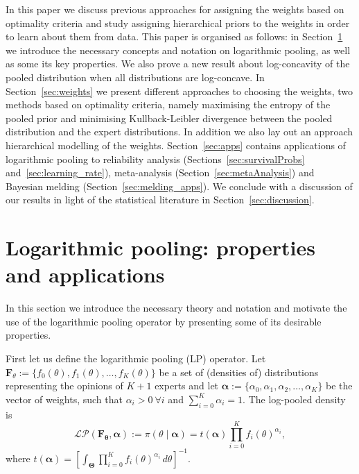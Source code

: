 \documentclass[12pt]{article}
\begin{document}
In this paper we discuss previous approaches for assigning the weights based on optimality criteria and study assigning hierarchical priors to the weights in order to learn about them from data.
This paper is organised as follows: in Section~\ref{sec:background} we introduce the necessary concepts and notation on logarithmic pooling, as well as some its key properties.
We also prove a new result about log-concavity of the pooled distribution when all distributions are log-concave.
In Section~\ref{sec:weights} we present different approaches to choosing the weights, two methods based on optimality criteria, namely maximising the entropy of the pooled prior and minimising Kullback-Leibler divergence between the pooled distribution and the expert distributions.
In addition we also lay out an approach hierarchical modelling of the weights.
Section~\ref{sec:apps} contains applications of logarithmic pooling to reliability analysis (Sections~\ref{sec:survivalProbs} and~\ref{sec:learning_rate}), meta-analysis (Section~\ref{sec:metaAnalysis}) and Bayesian melding (Section~\ref{sec:melding_apps}).
We conclude with a discussion of our results in light of the statistical literature in Section~\ref{sec:discussion}.


\section{Logarithmic pooling: properties and applications}
\label{sec:background}

In this section we introduce the necessary theory and notation and motivate the use of the logarithmic pooling operator by presenting some of its desirable properties.

First let us define the logarithmic pooling (LP) operator.
Let $\mathbf{F}_{\theta} := \{f_0(\theta), f_1(\theta), \ldots, f_K(\theta)\}$ be a set of (densities of) distributions representing the opinions of $K+1$ experts and let $\boldsymbol\alpha :=\{\alpha_0, \alpha_1, \alpha_2, \ldots, \alpha_K \}$ be the vector of weights, such that $\alpha_i > 0\: \forall i$ and $\sum_{i=0}^K \alpha_i = 1$.
The log-pooled density is
\begin{equation}
\label{eq:logpool}
 \mathcal{LP}(\mathbf{F_\theta}, \boldsymbol\alpha) := \pi(\theta \mid \boldsymbol\alpha) = t(\boldsymbol\alpha) \prod_{i=0}^K f_i(\theta)^{\alpha_i},
\end{equation}
where $t(\boldsymbol\alpha) = \left[ \int_{\boldsymbol\Theta}\prod_{i=0}^K f_i(\theta)^{\alpha_i}\, d\theta \right]^{-1}$.
\end{document}
